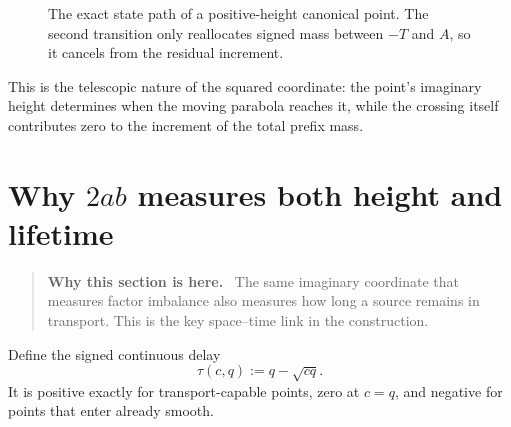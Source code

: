 \documentclass[11pt]{article}
\theoremstyle{definition}
\theoremstyle{remark}
\newcommand{\1}{\mathbf{1}}
\newenvironment{motivation}
  {\begin{quote}\small\color{ovvogray}\textbf{Why this section is here.}\ }
  {\end{quote}}
\begin{document}
\begin{figure}[htbp]
\centering
{}
\caption{The exact state path of a positive-height canonical point.  The second transition only reallocates signed mass between $-T$ and $A$, so it cancels from the residual increment.}
\label{fig:state-path}
\end{figure}

This is the telescopic nature of the squared coordinate: the point's imaginary height determines when the moving parabola reaches it, while the crossing itself contributes zero to the increment of the total prefix mass.

\section{Why $2ab$ measures both height and lifetime}
\label{sec:lifetime-law}

\begin{motivation}
The same imaginary coordinate that measures factor imbalance also measures how long a source remains in transport.  This is the key space--time link in the construction.
\end{motivation}

Define the signed continuous delay
\begin{equation}
 \tau(c,q):=q-\sqrt{cq}.
 \label{eq:tau}
\end{equation}
It is positive exactly for transport-capable points, zero at $c=q$, and negative for points that enter already smooth.
\end{document}
